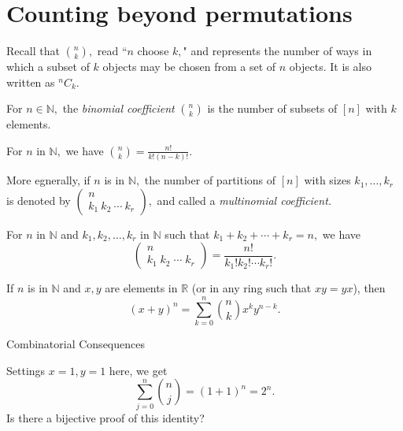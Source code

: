 


\section{Counting beyond permutations}

Recall that $\binom{n}{k},$ read ``$n$ choose $k,$"
and represents the number of ways in which a subset of $k$ objects 
may be chosen from a set of $n$ objects. It is also written as ${}^nC_k.$

\begin{definition}[$\binom{n}{k}$]
	For $n \in \mathbb{N},$ the \emph{binomial coefficient} $\binom{n}{k}$
	is the number of subsets of $[n]$ with $k$ elements.
\end{definition}

\begin{proposition}
	For $n$ in $\mathbb{N},$ we have $\binom{n}{k} =  \frac{n!}{k! (n-k)!}.$	
\end{proposition}


More egnerally, if $n$ is in $\mathbb{N},$ the number of partitions of $[n]$
with sizes $k_1, \dotsc, k_r$ is denoted by
$\begin{pmatrix} n \\ k_1 \: k_2\: \cdots \: k_r \end{pmatrix},$
and called a \emph{multinomial coefficient.}

\begin{theorem}
	For $n$ in $\mathbb{N}$ and $k_1, k_2, \dotsc, k_r$ in $\mathbb{N}$ such that
	$k_1 + k_ 2 + \cdots + k_r = n,$ we have 
	$$ \begin{pmatrix} n \\ k_1 \; k_ 2 \; \cdots \; k_r \end{pmatrix}
	= \frac{n!}{k_1 ! k_2 ! \cdots k_r!}. $$
\end{theorem}

\begin{theorem}
	If $n$ is in $\mathbb{N}$ and $x, y $ are elements in $\mathbb{R}$ (or in any ring 
	such that $xy = yx$), then 
	$$ (x+y)^n = \sum_{k=0}^{n} \binom{n}{k} x^k y^{n-k} .$$
\end{theorem}
Combinatorial Consequences


Settings $x=1, y=  1$ here, we get
$$
\sum_{j=0}^{n} \binom{n}{j} = (1+1)^n = 2^n.$$
Is there a bijective proof of this identity?


